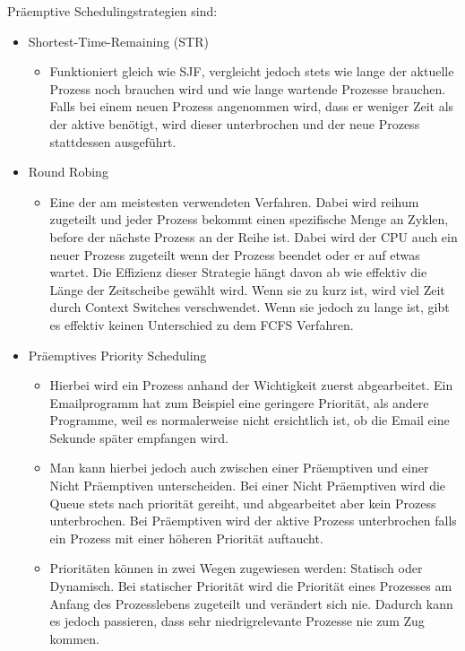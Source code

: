\documentclass{article}
\begin{document}
	Präemptive Schedulingstrategien sind:
	\begin{itemize}
		\item{Shortest-Time-Remaining (STR)}
		\begin{itemize}
			\item{Funktioniert gleich wie SJF, vergleicht jedoch stets wie lange der aktuelle Prozess noch brauchen wird und wie lange wartende Prozesse brauchen. Falls bei einem neuen Prozess angenommen wird, dass er weniger Zeit als der aktive benötigt, wird dieser unterbrochen und der neue Prozess stattdessen ausgeführt.}
		\end{itemize}
		\item{Round Robing}
		\begin{itemize}
			\item{Eine der am meistesten verwendeten Verfahren. Dabei wird reihum zugeteilt und jeder Prozess bekommt einen spezifische Menge an Zyklen, before der nächste Prozess an der Reihe ist. Dabei wird der CPU auch ein neuer Prozess zugeteilt wenn der Prozess beendet oder er auf etwas wartet. Die Effizienz dieser Strategie hängt davon ab wie effektiv die Länge der Zeitscheibe gewählt wird. Wenn sie zu kurz ist, wird viel Zeit durch Context Switches verschwendet. Wenn sie jedoch zu lange ist, gibt es effektiv keinen Unterschied zu dem FCFS Verfahren.}
		\end{itemize}
		\item{Präemptives Priority Scheduling}
		\begin{itemize}
			\item{Hierbei wird ein Prozess anhand der Wichtigkeit zuerst abgearbeitet. Ein Emailprogramm hat zum Beispiel eine geringere Priorität, als andere Programme, weil es normalerweise nicht ersichtlich ist, ob die Email eine Sekunde später empfangen wird.}
			\item{Man kann hierbei jedoch auch zwischen einer Präemptiven und einer Nicht Präemptiven unterscheiden. Bei einer Nicht Präemptiven wird die Queue stets nach priorität gereiht, und abgearbeitet aber kein Prozess unterbrochen. Bei Präemptiven wird der aktive Prozess unterbrochen falls ein Prozess mit einer höheren Priorität auftaucht.}
			\item{Prioritäten können in zwei Wegen zugewiesen werden: Statisch oder Dynamisch. Bei statischer Priorität wird die Priorität eines Prozesses am Anfang des Prozesslebens zugeteilt und verändert sich nie. Dadurch kann es jedoch passieren, dass sehr niedrigrelevante Prozesse nie zum Zug kommen. \\
}
\end{itemize}
\end{itemize}
\end{document}
